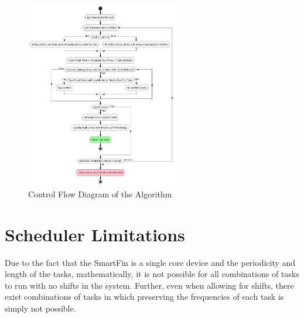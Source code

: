 \documentclass{article}
\begin{document}
\begin{figure}[h]
    \centering
    \includegraphics[width=0.6\textwidth]{control_flow.png}
    \caption{Control Flow Diagram of the Algorithm}
    \label{fig:example}
\end{figure}

\section{Scheduler Limitations}
Due to the fact that the SmartFin is a single core device and the periodicity and length of the tasks, mathematically, it is not possible for all combinations of tasks to run with no shifts in the system. Further, even when allowing for shifts, there exist combinations of tasks in which preserving the frequencies of each task is simply not possible.


{}

\end{document}
